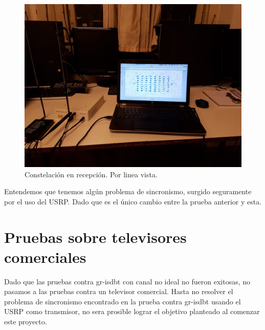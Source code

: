 \begin{figure}[!h]
	\centering
	\includegraphics[scale=0.25]{figuras/cap06/aire}
	\caption{\label{f:aire} Constelación en recepción. Por linea vista.}
\end{figure}

Entendemos que tenemos algún problema de sincronismo, surgido seguramente por el uso del USRP. Dado que es el único cambio entre la prueba anterior y esta. 

\section{Pruebas sobre televisores comerciales}

Dado que las pruebas contra gr-isdbt con canal no ideal no fueron exitosas, no pasamos a las pruebas contra un televisor comercial. Hasta no resolver el problema de sincronismo encontrado en la prueba contra gr-isdbt usando el USRP como transmisor, no sera prosible lograr el objetivo planteado al comenzar este proyecto. 